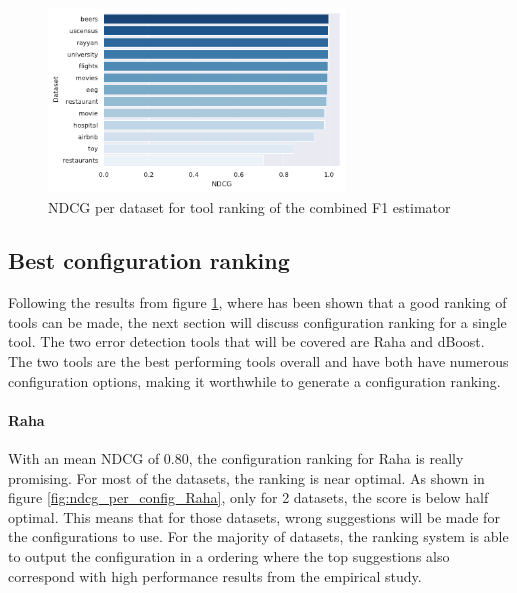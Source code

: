 \begin{figure}
    \centering
    \includegraphics[width=0.7\textwidth]{thesis/Figures/RQ3/15_ranking_ndcg_combined_f1_tool_wise.pdf}
    \caption{NDCG per dataset for tool ranking of the combined F1 estimator}
    \label{fig:ndcg_per_tool}
\end{figure}


\subsection{Best configuration ranking}
Following the results from figure \ref{fig:ndcg_per_tool}, where has been shown that a good ranking of tools can be made, the next section will discuss configuration ranking for a single tool. The two error detection tools that will be covered are Raha and dBoost. The two tools are the best performing tools overall and have both have numerous configuration options, making it worthwhile to generate a configuration ranking.

\paragraph{Raha} With an mean NDCG of 0.80, the configuration ranking for Raha is really promising. For most of the datasets, the ranking is near optimal. As shown in figure \ref{fig:ndcg_per_config_Raha}, only for 2 datasets, the score is below half optimal. This means that for those datasets, wrong suggestions will be made for the configurations to use. For the majority of datasets, the ranking system is able to output the configuration in a ordering where the top suggestions also correspond with high performance results from the empirical study. 

